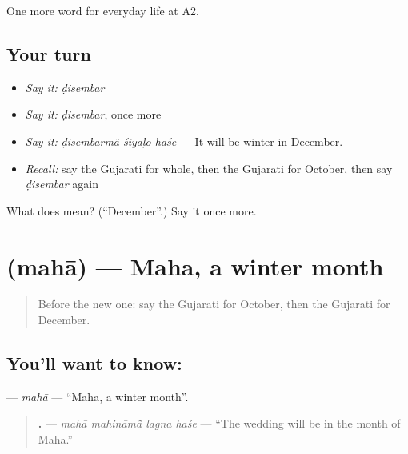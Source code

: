 \begin{grammarlens}[title={What you've built}]
One more word for everyday life at A2.
\end{grammarlens}

\subsection*{Your turn}
\begin{itemize}
\raggedright
  \item \emph{Say it:} \emph{ḍisembar}
  \item \emph{Say it:} \emph{ḍisembar}, once more
  \item \emph{Say it:} \emph{ḍisembarmā̃ śiyāḷo haśe} — It will be winter in December.
  \item \emph{Recall:} say the Gujarati for whole, then the Gujarati for October, then say \emph{ḍisembar} again
\end{itemize}

\begin{tcolorbox}[breakable,colback=teal!4,colframe=teal!35!black,title={Before you move on}]
What does  mean? (\textquotedblleft{}December\textquotedblright{}.) Say it once more.
\end{tcolorbox}
\section[\texorpdfstring{\gu{મહા} (mahā)}{મહા (mahā)}]{ (mahā) — Maha, a winter month}

\label{lesson:GU-C174-maha}



\begin{quote}
Before the new one: say the Gujarati for October, then the Gujarati for December.
\end{quote}

\subsection*{You'll want to know: }
\textbf{} — \emph{mahā} — \textquotedblleft{}Maha, a winter month\textquotedblright{}.

\begin{quote}
\textbf{   .} — \emph{mahā mahināmā̃ lagna haśe} — \textquotedblleft{}The wedding will be in the month of Maha.\textquotedblright{}
\end{quote}

